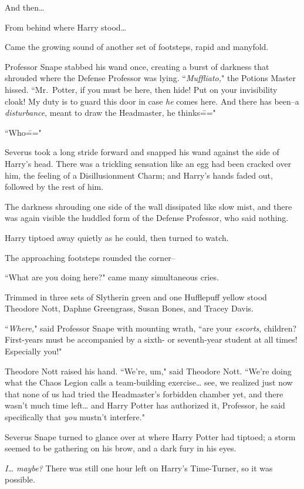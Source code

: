 And then{\ldots}

From behind where Harry stood{\ldots}

Came the growing sound of another set of footsteps, rapid and manyfold.

Professor Snape stabbed his wand once, creating a burst of darkness that shrouded where the Defense Professor was lying. ``\emph{Muffliato,}" the Potions Master hissed. ``Mr.~Potter, if you must be here, then hide! Put on your invisibility cloak! My duty is to guard this door in case \emph{he} comes here. And there has been\---a \emph{disturbance}, meant to draw the Headmaster, he thinks\==="

``Who\==="

Severus took a long stride forward and snapped his wand against the side of Harry's head. There was a trickling sensation like an egg had been cracked over him, the feeling of a Disillusionment Charm; and Harry's hands faded out, followed by the rest of him.

The darkness shrouding one side of the wall dissipated like slow mist, and there was again visible the huddled form of the Defense Professor, who said nothing.

Harry tiptoed away quietly as he could, then turned to watch.

The approaching footsteps rounded the corner\---

``What are you doing here?" came many simultaneous cries.

Trimmed in three sets of Slytherin green and one Hufflepuff yellow stood Theodore Nott, Daphne Greengrass, Susan Bones, and Tracey Davis.

``\emph{Where,}" said Professor Snape with mounting wrath, ``are your \emph{escorts}, children? First-years must be accompanied by a sixth- or seventh-year student at all times! Especially you!"

Theodore Nott raised his hand. ``We're, um," said Theodore Nott. ``We're doing what the Chaos Legion calls a team-building exercise{\ldots} see, we realized just now that none of us had tried the Headmaster's forbidden chamber yet, and there wasn't much time left{\ldots} and Harry Potter has authorized it, Professor, he said specifically that \emph{you} mustn't interfere."

Severus Snape turned to glance over at where Harry Potter had tiptoed; a storm seemed to be gathering on his brow, and a dark fury in his eyes.

\emph{I{\ldots} maybe?} There was still one hour left on Harry's Time-Turner, so it was possible.

